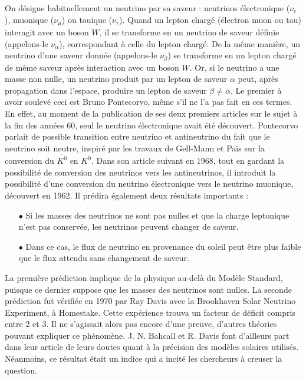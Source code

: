       On désigne habituellement un neutrino par sa saveur : neutrinos électronique ($\nu_e$), muonique ($\nu_{\mu}$) ou tauique ($\nu_{\tau}$). Quand un lepton chargé (électron muon ou tau) interagit avec un boson $W$, il se transforme en un neutrino de saveur définie (appelons-le $\nu_{\alpha}$), correspondant à celle du lepton chargé. De la même manière, un neutrino d'une saveur donnée (appelons-le $\nu_{\beta}$) se transforme en un lepton chargé de même saveur après interaction avec un boson $W$. Or, si le neutrino a une masse non nulle, un neutrino produit par un lepton de saveur $\alpha$ peut, après propagation dans l'espace, produire un lepton de saveur $\beta\ne\alpha$. Le premier à avoir soulevé ceci est Bruno Pontecorvo, même s'il ne l'a pas fait en ces termes. En effet, au moment de la publication de ses deux premiers articles\cite{Pontecorvo:1957cp,Pontecorvo:1957qd} sur le sujet à la fin des années 60, seul le neutrino électronique avait été découvert. Pontecorvo parlait de possible transition entre neutrino et antineutrino du fait que le neutrino soit neutre, inspiré par les travaux de Gell-Mann et Païs\cite{Gell-Mann1955} sur la conversion du $\overline{K^0}$ en  $K^0$. Dans son article suivant en 1968\cite{Pontecorvo1968}, tout en gardant la possibilité de conversion des neutrinos vers les antineutrinos, il introduit la possibilité d'une conversion du neutrino électronique vers le neutrino muonique, découvert en 1962\cite{Danby1962}. Il prédira également deux résultats importants :
      \begin{itemize}
        \item[$\bullet$] Si les masses des neutrinos ne sont pas nulles et que la charge leptonique n'est pas conservée, les neutrinos peuvent changer de saveur.
        \item[$\bullet$] Dans ce cas, le flux de neutrino en provenance du soleil peut être plus faible que le flux attendu sans changement de saveur.
      \end{itemize}
      La première prédiction implique de la physique au-delà du Modèle Standard, puisque ce dernier suppose que les masses des neutrinos sont nulles. La seconde prédiction fut vérifiée en 1970 par Ray Davis avec la Brookhaven Solar Neutrino Experiment\cite{Bahcall1976}, à Homestake. Cette expérience trouva un facteur de déficit compris entre 2 et 3. Il ne s'agissait alors pas encore d'une preuve, d'autres théories pouvant expliquer ce phénomène. J. N. Bahcall et R. Davis font d'ailleurs part dans leur article\cite{Bahcall1976} de leurs doutes quant à la précision des modèles solaires utilisés. Néanmoins, ce résultat était un indice qui a incité les chercheurs à creuser la question.

